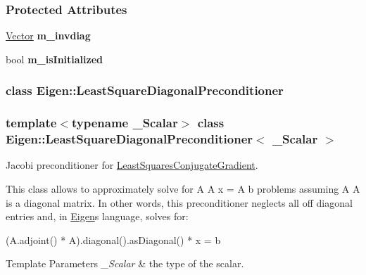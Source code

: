 \subsubsection*{Protected Attributes}
\begin{DoxyCompactItemize}
\item 
\mbox{\label{group___iterative_linear_solvers___module_abce7e6e756519949b58f201ef486d162}} 
\hyperlink{group___core___module}{Vector} {\bfseries m\+\_\+invdiag}
\item 
\mbox{\label{group___iterative_linear_solvers___module_a180911e1c0f848621dab8e29b5da88dc}} 
bool {\bfseries m\+\_\+is\+Initialized}
\end{DoxyCompactItemize}
\label{class_eigen_1_1_least_square_diagonal_preconditioner}
\subsubsection{class Eigen\+:\+:Least\+Square\+Diagonal\+Preconditioner}
\subsubsection*{template$<$typename \+\_\+\+Scalar$>$\newline
class Eigen\+::\+Least\+Square\+Diagonal\+Preconditioner$<$ \+\_\+\+Scalar $>$}

Jacobi preconditioner for \hyperlink{group___iterative_linear_solvers___module_class_eigen_1_1_least_squares_conjugate_gradient}{Least\+Squares\+Conjugate\+Gradient}. 

This class allows to approximately solve for A\textquotesingle{} A x = A\textquotesingle{} b problems assuming A\textquotesingle{} A is a diagonal matrix. In other words, this preconditioner neglects all off diagonal entries and, in \hyperlink{namespace_eigen}{Eigen}\textquotesingle{}s language, solves for\+: 
\begin{DoxyCode}
(A.adjoint() * A).diagonal().asDiagonal() * x = b
\end{DoxyCode}



\begin{DoxyTemplParams}{Template Parameters}
{\em \+\_\+\+Scalar} & the type of the scalar.\\
\hline
\end{DoxyTemplParams}


